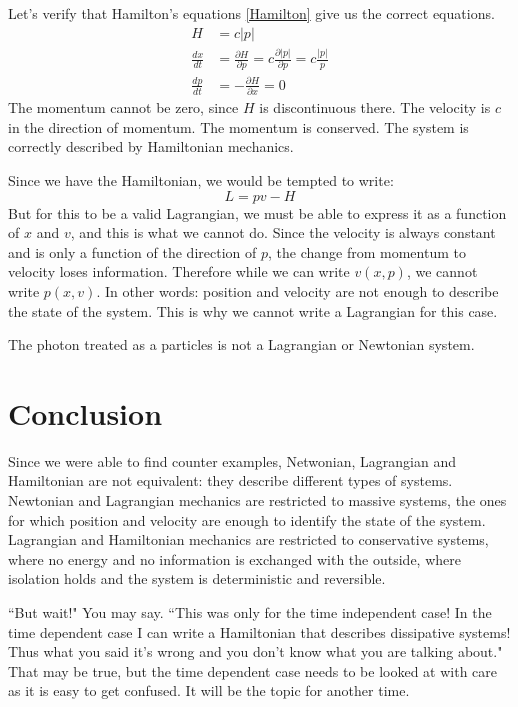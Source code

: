 \documentclass[11pt]{article}
\begin{document}
Let's verify that Hamilton's equations \eqref{Hamilton} give us the correct equations.
\begin{align*}
H &= c|p| \\
\frac{dx}{dt} &= \frac{\partial H}{\partial p} = c \frac{\partial |p|}{\partial p} = c \frac{|p|}{p} \\
\frac{dp}{dt} &= - \frac{\partial H}{\partial x} = 0
\end{align*}
The momentum cannot be zero, since $H$ is discontinuous there. The velocity is $c$ in the direction of momentum. The momentum is conserved. The system is correctly described by Hamiltonian mechanics.

Since we have the Hamiltonian, we would be tempted to write:
\begin{equation}
\label{Legendre}
L = pv - H
\end{equation}
But for this to be a valid Lagrangian, we must be able to express it as a function of $x$ and $v$, and this is what we cannot do. Since the velocity is always constant and is only a function of the direction of $p$, the change from momentum to velocity loses information. Therefore while we can write $v(x,p)$, we cannot write $p(x,v)$. In other words: position and velocity are not enough to describe the state of the system. This is why we cannot write a Lagrangian for this case.

The photon treated as a particles is not a Lagrangian or Newtonian system.

\section{Conclusion}

Since we were able to find counter examples, Netwonian, Lagrangian and Hamiltonian are not equivalent: they describe different types of systems. Newtonian and Lagrangian mechanics are restricted to massive systems, the ones for which position and velocity are enough to identify the state of the system. Lagrangian and Hamiltonian mechanics are restricted to conservative systems, where no energy and no information is exchanged with the outside, where isolation holds and the system is deterministic and reversible.

``But wait!" You may say. ``This was only for the time independent case! In the time dependent case I can write a Hamiltonian that describes dissipative systems! Thus what you said it's wrong and you don't know what you are talking about." That may be true, but the time dependent case needs to be looked at with care as it is easy to get confused. It will be the topic for another time.
\end{document}
